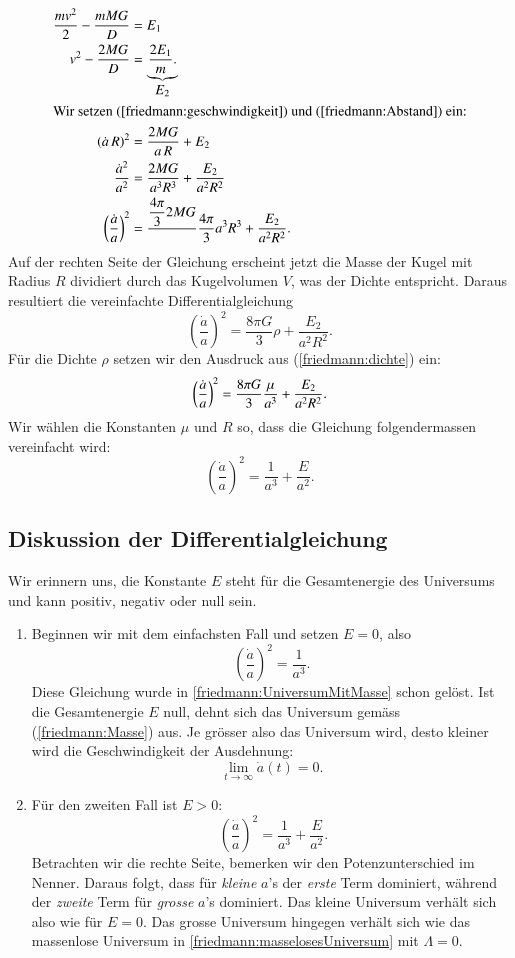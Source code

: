 \begin{refsection}
\begin{align*}
	\frac{m v^2}{2} - \frac{m M G}{D} &= E_1 \\ 
	v^2 - \frac{2 M G}{D} &= \underbrace{\frac{2E_1}{m}.}_{\displaystyle E_2} \\	
	\intertext{Wir setzen (\ref{friedmann:geschwindigkeit}) und (\ref{friedmann:Abstand}) ein:}
	\left( \dot{a} \, R\right)^2 &= \frac{2 M G}{a\,R} + E_2 \\
	\frac{\dot{a}^2}{a^2} &= \frac{2 M G}{a^3 R^3} + \frac{E_2}{a^2 R^2} \\
	\left(\frac{\dot{a}}{a} \right)^2 &= \frac{\displaystyle\frac{4 \pi}{3}2 M G}\displaystyle{\frac{4 \pi}{3} a^3 R^3} + \frac{E_2}{a^2 R^2}.
\end{align*}
Auf der rechten Seite der Gleichung erscheint jetzt die Masse der Kugel mit Radius $R$ dividiert durch das Kugelvolumen $V$, was der Dichte entspricht. Daraus resultiert die vereinfachte Differentialgleichung 
\begin{equation}
\left(\frac{\dot{a}}{a} \right)^2 = \frac{8 \pi G}{3} \rho + \frac{E_2}{a^2 R^2}.
\label{friedmann:EnergieerhaltungUniversum}
\end{equation}
Für die Dichte $\rho$ setzen wir den Ausdruck aus (\ref{friedmann:dichte}) ein:
\[\left(\frac{\dot{a}}{a} \right)^2 = \frac{8 \pi G}{3} \frac{\mu}{a^3} + \frac{E_2}{a^2 R^2}. \\\]
Wir wählen die Konstanten $\mu$ und $R$ so, dass die Gleichung folgendermassen vereinfacht wird:
\begin{equation}
\left(\frac{\dot{a}}{a} \right)^2 = \frac{1}{a^3} + \frac{E}{a^2}.
\end{equation}

\subsection{Diskussion der Differentialgleichung}
Wir erinnern uns, die Konstante $E$ steht für die Gesamtenergie des Universums und kann positiv, negativ oder null sein.
\begin{enumerate}
	\item Beginnen wir mit dem einfachsten Fall und setzen $E = 0$, also
	\[\left(\frac{\dot{a}}{a} \right)^2 = \frac{1}{a^3}.\]
	Diese Gleichung wurde in \ref{friedmann:UniversumMitMasse} schon gelöst. Ist die Gesamtenergie $E$ null, dehnt sich das Universum gemäss  (\ref{friedmann:Masse}) aus. Je grösser also das Universum wird, desto kleiner wird die Geschwindigkeit der Ausdehnung:
	\[\lim_{t\to\infty} \dot{a}(t) = 0.\]
	\item Für den zweiten Fall ist $E > 0$:
	\[\ \left(\frac{\dot{a}}{a} \right)^2 = \frac{1}{a^3} + \frac{E}{a^2}.\]
	Betrachten wir die rechte Seite, bemerken wir den Potenzunterschied im Nenner. Daraus folgt, dass für {\em kleine} $a$'s der {\em erste} Term dominiert, während der {\em zweite} Term für {\em grosse} $a$'s dominiert. Das kleine Universum verhält sich also wie für $E = 0$. Das grosse Universum hingegen verhält sich wie das massenlose Universum in \ref{friedmann:masselosesUniversum} mit $\Lambda = 0$.  
	

\end{enumerate}
\end{refsection}
